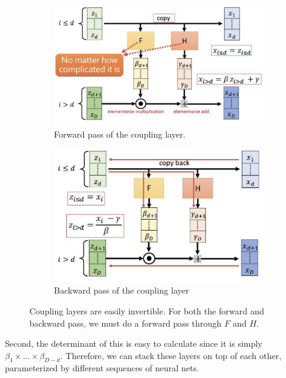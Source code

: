     \begin{figure}[H]
      \centering
      \begin{subfigure}[b]{0.48\textwidth}
      \centering
        \includegraphics[width=\textwidth]{img/couple_forward.png}
        \caption{Forward pass of the coupling layer.}
        \label{fig:for}
      \end{subfigure}
      \hfill 
      \begin{subfigure}[b]{0.48\textwidth}
      \centering
        \includegraphics[width=\textwidth]{img/couple_backward.png}
        \caption{Backward pass of the coupling layer}
        \label{fig:back}
      \end{subfigure}
      \caption{Coupling layers are easily invertible. For both the forward and backward pass, we must do a forward pass through $F$ and $H$. }
      \label{fig:coupling_layer}
    \end{figure}

    Second, the determinant of this is easy to calculate since it is simply $\beta_1 \times \ldots \times \beta_{D-d}$. Therefore, we can stack these layers on top of each other, parameterized by different sequences of neural nets. 

